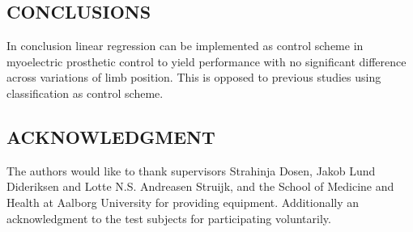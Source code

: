 \begin{multicols}{2}
\section*{CONCLUSIONS}%
	
% 		
In conclusion linear regression can be implemented as control scheme in myoelectric prosthetic control to yield performance with no significant difference across variations of limb position. This is opposed to previous studies using classification as control scheme.
 		
	
	
	
	\subsection*{ACKNOWLEDGMENT}
	
	The authors would like to thank supervisors Strahinja Dosen, Jakob Lund Dideriksen and Lotte N.S. Andreasen Struijk, and the School of Medicine and Health at Aalborg University for providing equipment. Additionally an acknowledgment to the test subjects for participating voluntarily.
	
	

\end{multicols}
